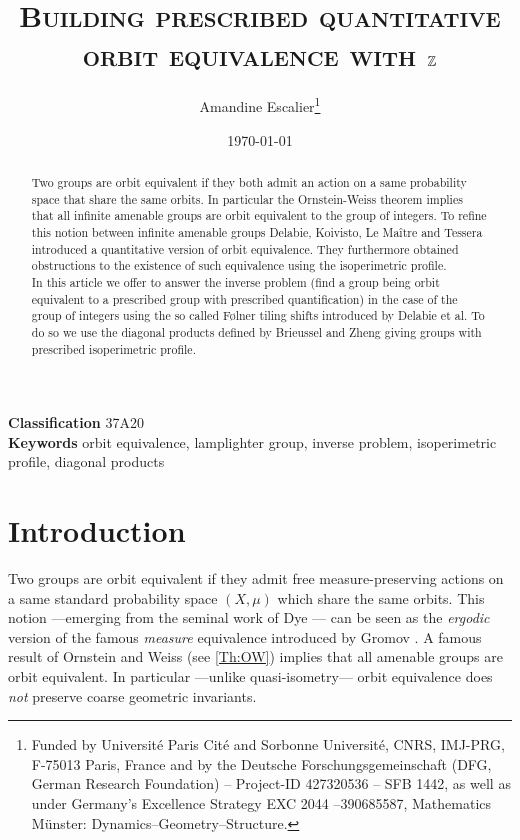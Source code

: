 \documentclass[english, 11pt, a4paper]{article}
\title{\texorpdfstring{\textsc{Building prescribed quantitative orbit
      equivalence with $\mathbb{Z}$}}{Building prescribed quantitative orbit
    equivalence with the group of integers}}
\author{\texorpdfstring{Amandine Escalier\thanks{Funded by Université
      Paris Cité and Sorbonne Université,
      CNRS, IMJ-PRG, F-75013 Paris, France and by the Deutsche
      Forschungsgemeinschaft (DFG, German Research Foundation) – Project-ID
      427320536 – SFB 1442, as well as under Germany’s 
      Excellence Strategy EXC 2044 –390685587, Mathematics Münster:
      Dynamics–Geometry–Structure.}}{Amandine Escalier}}
\date{\today}
\theoremstyle{definition}
\numberwithin{equation}{section}
\begin{document}

\maketitle

\begin{abstract}
  Two groups are orbit equivalent if they both admit an action
  on a same probability space that share the same orbits. In particular the Ornstein-Weiss theorem implies that all infinite
  amenable groups are orbit equivalent to the group of integers. To refine this
  notion between infinite amenable groups Delabie,
  Koivisto, Le Maître and Tessera introduced a quantitative version of orbit
  equivalence. They furthermore obtained obstructions to 
  the existence of such equivalence using the isoperimetric profile.\\
  In this article we offer to answer the inverse problem (find a group being
  orbit equivalent to a prescribed group with prescribed
  quantification) in the case of the group of integers using the so called
  Følner tiling shifts introduced by Delabie et al. To do so we use the
  diagonal products defined by Brieussel and Zheng 
  giving groups with prescribed isoperimetric profile.
\end{abstract}
\vspace{0.5cm}
\noindent\textbf{Classification} 37A20\\
\textbf{Keywords} orbit equivalence, lamplighter group, inverse problem,
isoperimetric profile, diagonal products
\vspace{0.75cm}

\section{Introduction} \label{Sec:Intro}
Two groups are orbit equivalent if they admit free measure-preserving actions on a same
standard probability space $(X, \mu)$ which share the same orbits. This notion
—emerging from the seminal work of Dye \cite{DyeI,DyeII}— can be seen as the
\emph{ergodic} version of the famous \emph{measure} equivalence introduced by
Gromov \cite{Gro}. A famous result of 
Ornstein and Weiss (see \cref{Th:OW}) implies that all amenable groups are
orbit equivalent. In particular —unlike quasi-isometry— orbit equivalence
does \emph{not} preserve coarse geometric invariants.
\end{document}

